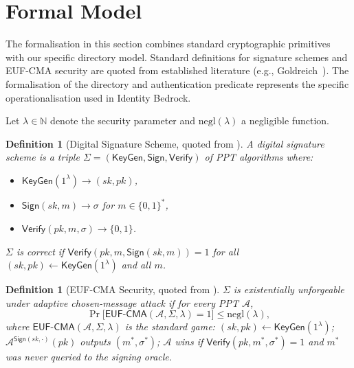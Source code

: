 \documentclass[11pt,a4paper]{article}
\newtheorem{definition}[theorem]{Definition}
\begin{document}
\section{Formal Model}
\label{sec:formal}

The formalisation in this section combines standard cryptographic primitives with our specific directory model. Standard definitions for signature schemes and EUF-CMA security are quoted from established literature (e.g., Goldreich~\cite{goldreich2001}). The formalisation of the directory and authentication predicate represents the specific operationalisation used in Identity Bedrock.

Let $\lambda \in \mathbb{N}$ denote the security parameter and
$\mathrm{negl}(\lambda)$ a negligible function.

\begin{definition}[Digital Signature Scheme, quoted from \cite{goldreich2001}]
  \label{def:sigscheme}
  A digital signature scheme is a triple $\Sigma = (\mathsf{KeyGen},
  \mathsf{Sign}, \mathsf{Verify})$ of PPT algorithms where:
  \begin{itemize}
    \item $\mathsf{KeyGen}(1^\lambda) \to (sk, pk)$,
    \item $\mathsf{Sign}(sk, m) \to \sigma$ for $m \in \{0,1\}^*$,
    \item $\mathsf{Verify}(pk, m, \sigma) \to \{0,1\}$.
  \end{itemize}
  $\Sigma$ is \emph{correct} if $\mathsf{Verify}(pk, m, \mathsf{Sign}(sk,m))
  = 1$ for all $(sk,pk) \gets \mathsf{KeyGen}(1^\lambda)$ and all $m$.
\end{definition}

\begin{definition}[EUF-CMA Security, quoted from \cite{goldreich2001}]
  \label{def:eufcma}
  $\Sigma$ is \emph{existentially unforgeable under adaptive chosen-message
  attack} if for every PPT $\mathcal{A}$,
  \[
    \Pr\bigl[\mathsf{EUF\text{-}CMA}(\mathcal{A},\Sigma,\lambda) = 1\bigr]
    \leq \mathrm{negl}(\lambda),
  \]
  where $\mathsf{EUF\text{-}CMA}(\mathcal{A},\Sigma,\lambda)$ is the standard
  game: $(sk,pk) \gets \mathsf{KeyGen}(1^\lambda)$; $\mathcal{A}^{\mathsf{Sign}(sk,\cdot)}(pk)$
  outputs $(m^*, \sigma^*)$; $\mathcal{A}$ wins if $\mathsf{Verify}(pk,
  m^*, \sigma^*) = 1$ and $m^*$ was never queried to the signing oracle.
\end{definition}
\end{document}

